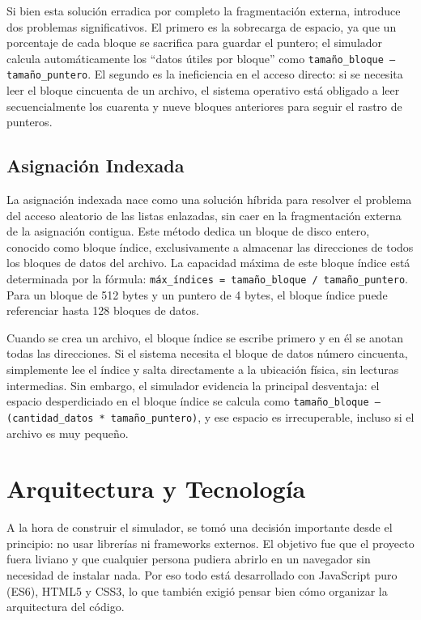\documentclass[12pt,a4paper]{article}
\begin{document}
Si bien esta solución erradica por completo la fragmentación externa, introduce dos problemas significativos. El primero es la sobrecarga de espacio, ya que un porcentaje de cada bloque se sacrifica para guardar el puntero; el simulador calcula automáticamente los ``datos útiles por bloque'' como \texttt{tamaño\_bloque -- tamaño\_puntero}. El segundo es la ineficiencia en el acceso directo: si se necesita leer el bloque cincuenta de un archivo, el sistema operativo está obligado a leer secuencialmente los cuarenta y nueve bloques anteriores para seguir el rastro de punteros.

\subsection{Asignación Indexada}

La asignación indexada nace como una solución híbrida para resolver el problema del acceso aleatorio de las listas enlazadas, sin caer en la fragmentación externa de la asignación contigua. Este método dedica un bloque de disco entero, conocido como bloque índice, exclusivamente a almacenar las direcciones de todos los bloques de datos del archivo. La capacidad máxima de este bloque índice está determinada por la fórmula: \texttt{máx\_índices = tamaño\_bloque / tamaño\_puntero}. Para un bloque de 512 bytes y un puntero de 4 bytes, el bloque índice puede referenciar hasta 128 bloques de datos.

Cuando se crea un archivo, el bloque índice se escribe primero y en él se anotan todas las direcciones. Si el sistema necesita el bloque de datos número cincuenta, simplemente lee el índice y salta directamente a la ubicación física, sin lecturas intermedias. Sin embargo, el simulador evidencia la principal desventaja: el espacio desperdiciado en el bloque índice se calcula como \texttt{tamaño\_bloque -- (cantidad\_datos * tamaño\_puntero)}, y ese espacio es irrecuperable, incluso si el archivo es muy pequeño.

\section{Arquitectura y Tecnología}

A la hora de construir el simulador, se tomó una decisión importante desde el principio: no usar librerías ni frameworks externos. El objetivo fue que el proyecto fuera liviano y que cualquier persona pudiera abrirlo en un navegador sin necesidad de instalar nada. Por eso todo está desarrollado con JavaScript puro (ES6), HTML5 y CSS3, lo que también exigió pensar bien cómo organizar la arquitectura del código.
\end{document}
